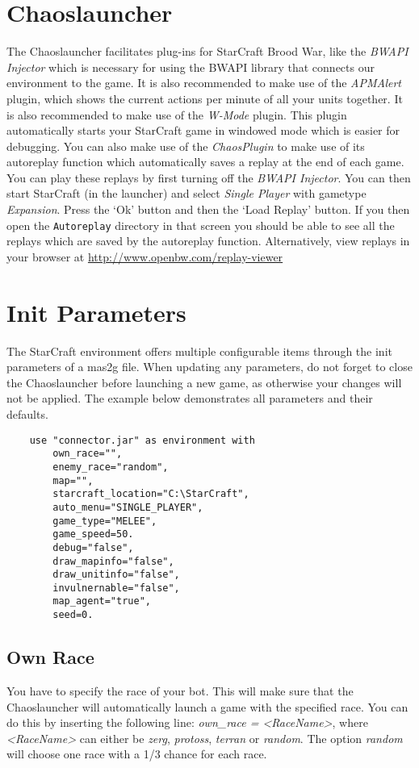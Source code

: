 \section{Chaoslauncher}
The Chaoslauncher facilitates plug-ins for StarCraft Brood War, like the \textit{BWAPI Injector} which is necessary for using the BWAPI library that connects our environment to the game. It is also recommended to make use of the \textit{APMAlert} plugin, which shows the current actions per minute of all your units together. It is also recommended to make use of the \textit{W-Mode} plugin. This plugin automatically starts your StarCraft game in windowed mode which is easier for debugging. You can also make use of the \textit{ChaosPlugin} to make use of its autoreplay function which automatically saves a replay at the end of each game. You can play these replays by first turning off the \textit{BWAPI Injector}. You can then start StarCraft (in the launcher) and select \textit{Single Player} with gametype \textit{Expansion}. Press the `Ok' button and then the `Load Replay' button. If you then open the \texttt{Autoreplay} directory in that screen you should be able to see all the replays which are saved by the autoreplay function.  Alternatively, view replays in your browser at \url{http://www.openbw.com/replay-viewer}

\section{Init Parameters}
\label{mas2g}
The StarCraft environment offers multiple configurable items through the init parameters of a mas2g file. When updating any parameters, do not forget to close the Chaoslauncher before launching a new game, as otherwise your changes will not be applied. The example below demonstrates all parameters and their defaults.

\begin{verbatim}
    use "connector.jar" as environment with
        own_race="",
        enemy_race="random",
        map="",
        starcraft_location="C:\StarCraft",
        auto_menu="SINGLE_PLAYER",
        game_type="MELEE",
        game_speed=50.
        debug="false",
        draw_mapinfo="false",
        draw_unitinfo="false",
        invulnernable="false",
        map_agent="true",
        seed=0.
\end{verbatim}

\subsection{Own Race}
\label{own race}
You have to specify the race of your bot. This will make sure that the Chaoslauncher will automatically launch a game with the specified race. You can do this by inserting the following line: \textit{own\_race = <RaceName>}, where \textit{<RaceName>} can either be \textit{zerg}, \textit{protoss}, \textit{terran} or \textit{random}. The option \textit{random} will choose one race with a 1/3 chance for each race.

